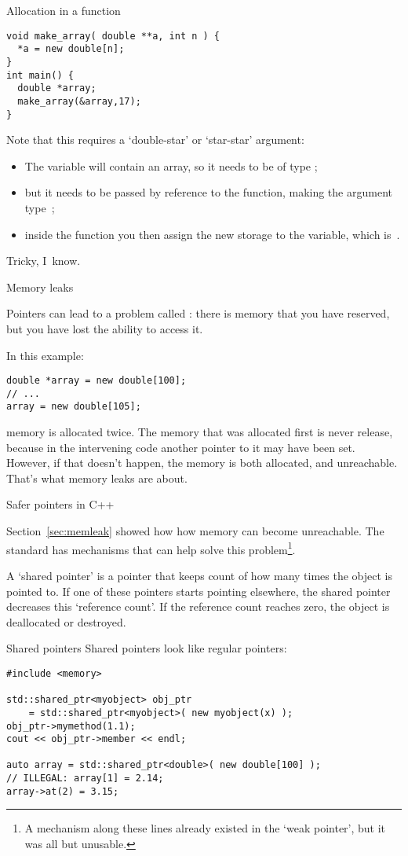 \begin{block}{Allocation in a function}
\begin{verbatim}
void make_array( double **a, int n ) {
  *a = new double[n];
}
int main() {
  double *array;
  make_array(&array,17);
}
\end{verbatim}
\end{block}

Note that this requires a `double-star' or `star-star' argument:
\begin{itemize}
\item The variable  will contain an array, so it needs to be of
  type ;
\item but it needs to be passed by reference to the function, making
  the argument type~;
\item inside the function you then assign the new storage to the
   variable, which is~.
\end{itemize}
Tricky, I~know.

 {Memory leaks}
\label{sec:memleak}

Pointers can lead to a problem called :
there is memory that you have reserved, but you have lost the ability
to access it.

In this example:
\begin{verbatim}
double *array = new double[100];
// ...
array = new double[105];
\end{verbatim}
memory is allocated twice. The memory that was allocated first is
never release, because in the intervening code another pointer to it
may have been set. However, if that doesn't happen, the memory is both
allocated, and unreachable. That's what memory leaks are about.

 {Safer pointers in C++}
\label{sec:shared_ptr}

Section~\ref{sec:memleak} showed how how memory can become
unreachable. The  standard has mechanisms that can
help solve this problem\footnote{A mechanism along these lines already
  existed in the `weak pointer', but it was all but unusable.}.

A `shared pointer' is a pointer that keeps count of how many times the
object is pointed to. If one of these pointers starts pointing
elsewhere, the shared pointer decreases this `reference count'. If the
reference count reaches zero, the object is deallocated or destroyed.

\begin{block}{Shared pointers}
  \label{sl:shared-ptr}
Shared pointers look like regular pointers:
\begin{verbatim}
#include <memory>

std::shared_ptr<myobject> obj_ptr
    = std::shared_ptr<myobject>( new myobject(x) );
obj_ptr->mymethod(1.1);
cout << obj_ptr->member << endl;

auto array = std::shared_ptr<double>( new double[100] );
// ILLEGAL: array[1] = 2.14;
array->at(2) = 3.15;
\end{verbatim}
\end{block}

